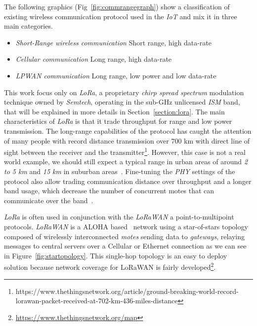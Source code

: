 The following graphics (Fig~\ref{fig:commrangegraph}) show a classification of
existing wireless communication protocol used in the \emph{IoT} and mix it in three 
main categories.

\begin{itemize}
    \item \emph{Short-Range wireless communication} Short range, high data-rate
    \item \emph{Cellular communication} Long range, high data-rate
    \item \emph{LPWAN communication} Long range, low power and low data-rate
\end{itemize}



This work focus only on \emph{LoRa}, a proprietary \emph{chirp spread spectrum}
modulation technique owned by \emph{Semtech}, operating in the sub-GHz
unlicensed \emph{ISM} band, that will be explained in more details in 
Section~\ref{section:lora}.
The main characteristics of \emph{LoRa} is that it trade throughput for range
and low power transmission. 
The long-range capabilities of the protocol has caught the attention of
many people with record distance transmission over 700 km
with direct line of sight between the receiver and the
transmitter\footnote{https://www.thethingsnetwork.org/article/ground-breaking-world-record-lorawan-packet-received-at-702-km-436-miles-distance}.
However, this case is not a real world example, we should still expect a typical 
range in urban areas of around \emph{2 to 5 km} and \emph{15 km} in suburban
areas~\cite{8030482}. Fine-tuning the \emph{PHY} settings of the protocol also
allow trading communication distance over throughput and a longer band usage,
which decrease the number of concurrent motes that can communicate over the
band~\cite{10.1145/2988287.2989163}.

\emph{LoRa} is often used in conjunction with the \emph{LoRaWAN} a 
point-to-multipoint protocols.
\emph{LoRaWAN} is a ALOHA based~\cite{loraalliance:lorawanspecification} network
using a star-of-stars topology composed of wirelessly interconnected 
\emph{motes} sending data to \emph{gateways}, relaying messages to central 
servers over a Cellular or Ethernet connection as we can see in 
Figure~\ref{fig:startopology}.
This single-hop topology is an easy to deploy solution because network coverage
for LoRaWAN is fairly
developed\footnote{\url{https://www.thethingsnetwork.org/map}}.

